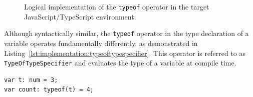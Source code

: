 \begin{figure}[tb]
	\centering
	\def\stackalignment{r}
	\caption{Logical implementation of the \lstinline|typeof| operator in the target JavaScript/TypeScript environment.}
	\label{fig:implementation:typeofimplementation}
\end{figure}

Although syntactically similar, the \lstinline|typeof| operator in the type declaration of a variable operates fundamentally differently, as demonstrated in Listing~\ref{lst:implementation:typeoftypespecifier}. This operator is referred to as \lstinline|TypeOfTypeSpecifier| and evaluates the type of a variable at compile time.

\begin{lstlisting}[language=Kipper,caption=Specifying the type based on a reference variable, label=lst:implementation:typeoftypespecifier]
var t: num = 3;
var count: typeof(t) = 4;
\end{lstlisting}

